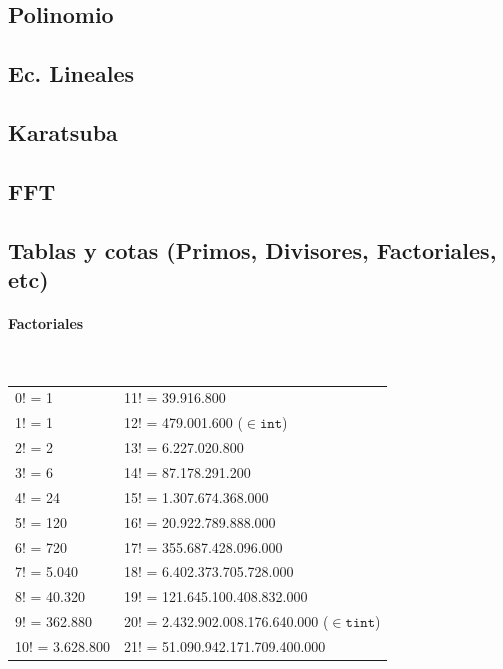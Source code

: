 \subsection{Polinomio}
\subsection{Ec. Lineales}

\subsection{Karatsuba}

\subsection{FFT}
\subsection{Tablas y cotas (Primos, Divisores, Factoriales, etc)}
\paragraph{Factoriales} \ \\
\begin{tabular}{l|l}
0! =	1             & 11! = 39.916.800  \\
1! =	1             & 12! =	479.001.600	($\in \mathtt{int}$)\\
2! =	2             & 13! =	6.227.020.800	\\
3! =	6             & 14! =	87.178.291.200	\\
4! =	24            & 15! =	1.307.674.368.000	\\
5! =	120   			  & 16! =	20.922.789.888.000	\\
6! =	720           & 17! =	355.687.428.096.000	\\
7! =	5.040	        & 18! =	6.402.373.705.728.000	\\
8! =	40.320	      & 19! =	121.645.100.408.832.000	\\
9! =	362.880       & 20! =	2.432.902.008.176.640.000	($\in \mathtt{tint}$) \\
10! =	3.628.800     & 21! =	51.090.942.171.709.400.000
\end{tabular}
 
